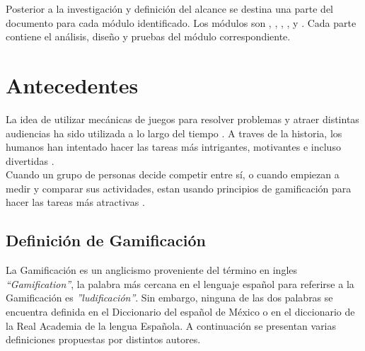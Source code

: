  \noindent Posterior a la investigación y definición del alcance se destina una parte del documento para cada módulo identificado. Los módulos son , , , ,  y . Cada parte contiene el análisis, diseño y pruebas del módulo correspondiente.

 \clearpage

\section{Antecedentes} \label{sec:antecedentes}

 La idea de utilizar mecánicas de juegos para resolver problemas y atraer distintas audiencias ha sido utilizada a lo largo del tiempo \cite{GamByDesign}. A traves de la historia, los humanos han intentado hacer las tareas más intrigantes, motivantes e incluso divertidas \cite{Octalysis}.\\

 \noindent Cuando un grupo de personas decide competir entre sí, o cuando empiezan a medir y comparar sus actividades, estan usando principios de gamificación para hacer las tareas más atractivas \cite[p. 7]{Octalysis}.

\subsection{Definición de Gamificación}

 La Gamificación es un anglicismo proveniente del término en ingles {\it ``Gamification''}, la palabra más cercana en el lenguaje español para referirse a la Gamificación es {\it ''ludificación''}. Sin embargo, ninguna de las dos palabras se encuentra definida en el Diccionario del español de México o en el diccionario de la Real Academia de la lengua Española. A continuación se presentan varias definiciones propuestas por distintos autores.

